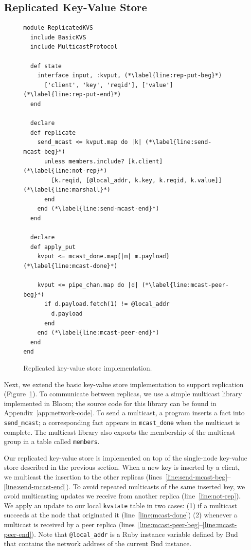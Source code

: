 \subsection{Replicated Key-Value Store}
\label{sec:rep-kvs}

\begin{figure}[t]
\begin{scriptsize}
\begin{lstlisting}
module ReplicatedKVS
  include BasicKVS
  include MulticastProtocol

  def state
    interface input, :kvput, (*\label{line:rep-put-beg}*)
      ['client', 'key', 'reqid'], ['value']  (*\label{line:rep-put-end}*)
  end

  declare
  def replicate
    send_mcast <= kvput.map do |k| (*\label{line:send-mcast-beg}*)
      unless members.include? [k.client]  (*\label{line:not-rep}*)
        [k.reqid, [@local_addr, k.key, k.reqid, k.value]]   (*\label{line:marshall}*)            
      end
    end (*\label{line:send-mcast-end}*)
  end

  declare
  def apply_put
    kvput <= mcast_done.map{|m| m.payload}  (*\label{line:mcast-done}*)

    kvput <= pipe_chan.map do |d| (*\label{line:mcast-peer-beg}*)
      if d.payload.fetch(1) != @local_addr
        d.payload
      end
    end (*\label{line:mcast-peer-end}*)
  end
end
\end{lstlisting}
\vspace{-10pt}
\caption{Replicated key-value store implementation.}
\label{fig:kvs-repl}
\end{scriptsize}
\vspace{-2pt}
\end{figure}

Next, we extend the basic key-value store implementation to support replication
(Figure~\ref{fig:kvs-repl}). To communicate between replicas, we use a simple
multicast library implemented in Bloom; the source code for this
library can be found in Appendix~\ref{app:network-code}. To send a multicast, a
program inserts a fact into \texttt{send\_mcast}; a corresponding fact appears
in \texttt{mcast\_done} when the multicast is complete. The multicast library
also exports the membership of the multicast group in a table called
\texttt{members}.

Our replicated key-value store is implemented on top of the single-node
key-value store described in the previous section. When a new key is inserted by
a client, we multicast the insertion to the other replicas
(lines~\ref{line:send-mcast-beg}--\ref{line:send-mcast-end}). To avoid repeated
multicasts of the same inserted key, we avoid multicasting updates we receive
from another replica (line~\ref{line:not-rep}). We apply an update to our local
\texttt{kvstate} table in two cases: (1) if a multicast succeeds at the node
that originated it (line~\ref{line:mcast-done}) (2) whenever a multicast is
received by a peer replica
(lines~\ref{line:mcast-peer-beg}--\ref{line:mcast-peer-end}).  Note that
\texttt{@local\_addr} is a Ruby instance variable defined by Bud that contains the
network address of the current Bud instance.

